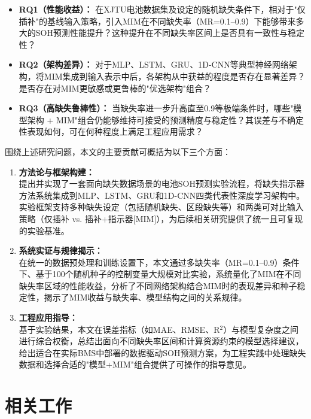 \documentclass[10pt,a4paper]{ctexart}
\begin{document}
\begin{itemize}[leftmargin=2em]
    \item \textbf{RQ1（性能收益）：} 在XJTU电池数据集及设定的随机缺失条件下，相对于"仅插补"的基线输入策略，引入MIM在不同缺失率（MR=0.1--0.9）下能够带来多大的SOH预测性能提升？这种提升在不同缺失率区间上是否具有一致性与稳定性？
    
    \item \textbf{RQ2（架构差异）：} 对于MLP、LSTM、GRU、1D-CNN等典型神经网络架构，将MIM集成到输入表示中后，各架构从中获益的程度是否存在显著差异？是否存在对MIM更敏感或更鲁棒的"优选架构"组合？
    
    \item \textbf{RQ3（高缺失鲁棒性）：} 当缺失率进一步升高直至0.9等极端条件时，哪些"模型架构 + MIM"组合仍能够维持可接受的预测精度与稳定性？其误差与不确定性表现如何，可在何种程度上满足工程应用需求？
\end{itemize}

围绕上述研究问题，本文的主要贡献可概括为以下三个方面：

\begin{enumerate}[label=(\arabic*)]
    \item \textbf{方法论与框架构建：}\\
    提出并实现了一套面向缺失数据场景的电池SOH预测实验流程，将缺失指示器方法系统集成到MLP、LSTM、GRU和1D-CNN四类代表性深度学习架构中。实验框架支持多种缺失设定（包括随机缺失、区段缺失等）和两类可对比输入策略（仅插补 vs. 插补+指示器[MIM]），为后续相关研究提供了统一且可复现的实验基准。
    
    \item \textbf{系统实证与规律揭示：}\\
    在统一的数据预处理和训练设置下，本文通过多缺失率（MR=0.1--0.9）条件下、基于100个随机种子的控制变量大规模对比实验，系统量化了MIM在不同缺失率区域的性能收益，分析了不同网络架构结合MIM时的表现差异和种子稳定性，揭示了MIM收益与缺失率、模型结构之间的关系规律。
    
    \item \textbf{工程应用指导：}\\
    基于实验结果，本文在误差指标（如MAE、RMSE、R$^2$）与模型复杂度之间进行综合权衡，总结出面向不同缺失率区间和计算资源约束的模型选择建议，给出适合在实际BMS中部署的数据驱动SOH预测方案，为工程实践中处理缺失数据和选择合适的"模型+MIM"组合提供了可操作的指导意见。
\end{enumerate}

\section{相关工作}\label{sec:related}
\end{document}
